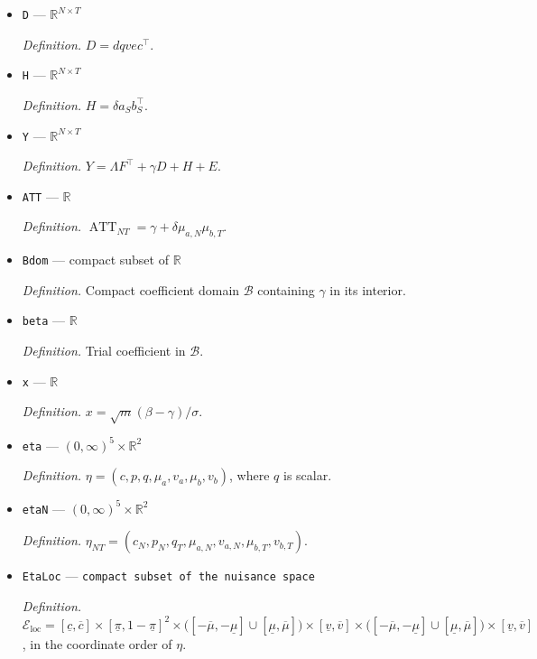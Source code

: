\documentclass{article}
\begin{document}
\begin{itemize}
  \par\smallskip\noindent\emph{Definition.} \texttt{Common component of the treatment effect.}
  \item \texttt{D} --- \(\mathbb R^{N\times T}\)
  \par\smallskip\noindent\emph{Definition.} \(D=dqvec^{\top}\).
  \item \texttt{H} --- \(\mathbb R^{N\times T}\)
  \par\smallskip\noindent\emph{Definition.} \(H=\delta a_Sb_S^{\top}\).
  \item \texttt{Y} --- \(\mathbb R^{N\times T}\)
  \par\smallskip\noindent\emph{Definition.} \(Y=\Lambda F^{\top}+\gamma D+H+E\).
  \item \texttt{ATT} --- \(\mathbb R\)
  \par\smallskip\noindent\emph{Definition.} \(\operatorname{ATT}_{NT}=\gamma+\delta\mu_{a,N}\mu_{b,T}\).
  \item \texttt{Bdom} --- compact subset of \(\mathbb R\)
  \par\smallskip\noindent\emph{Definition.} Compact coefficient domain \(\mathcal B\) containing \(\gamma\) in its interior.
  \item \texttt{beta} --- \(\mathbb R\)
  \par\smallskip\noindent\emph{Definition.} Trial coefficient in \(\mathcal B\).
  \item \texttt{x} --- \(\mathbb R\)
  \par\smallskip\noindent\emph{Definition.} \(x=\sqrt m(\beta-\gamma)/\sigma\).
  \item \texttt{eta} --- \((0,\infty)^5\times\mathbb R^2\)
  \par\smallskip\noindent\emph{Definition.} \(\eta=(c,p,q,\mu_a,v_a,\mu_b,v_b)\), where \(q\) is scalar.
  \item \texttt{etaN} --- \((0,\infty)^5\times\mathbb R^2\)
  \par\smallskip\noindent\emph{Definition.} \(\eta_{NT}=(c_N,p_N,q_T,\mu_{a,N},v_{a,N},\mu_{b,T},v_{b,T})\).
  \item \texttt{EtaLoc} --- \texttt{compact subset of the nuisance space}
  \par\smallskip\noindent\emph{Definition.} \(\mathcal E_{\mathrm{loc}}=[\underline c,\overline c]\times[\underline\pi,1-\underline\pi]^2\times\bigl([ -\overline\mu,-\underline\mu]\cup[\underline\mu,\overline\mu]\bigr)\times[\underline v,\overline v]\times\bigl([ -\overline\mu,-\underline\mu]\cup[\underline\mu,\overline\mu]\bigr)\times[\underline v,\overline v]\), in the coordinate order of \(\eta\).

\end{itemize}
\end{document}
